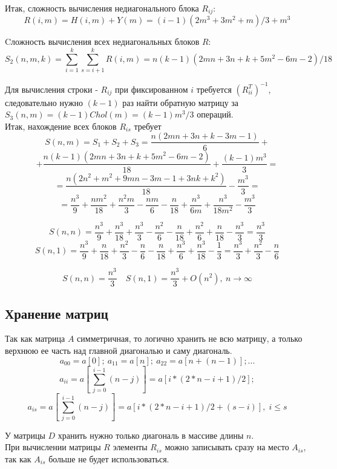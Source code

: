 \documentclass[a4paper,12pt]{article}
\begin{document}
    Итак, сложность вычисления недиагонального блока $R_{ij}$:
    $$ 
        R(i,m) = H(i,m) + Y(m) =
        (i-1)(2m^3+3m^2+m)/3 + m^3
    $$
    
    Cложность вычисления всех недиагональных блоков $R$:
    $$ 
        S_2(n,m,k) = 
        \sum_{i=1}^k\sum_{s=i+1}^k R(i,m) =
        n(k-1)(2mn+3n+k+5m^2-6m-2)/18
    $$
    
    Для вычисления строки - $R_{ij}$ при фиксированном $i$ требуется $(R_{ii}^T)^{-1}$,
    следовательно нужно $(k-1)$ раз найти обратную матрицу за \\
    $S_3(n, m) = (k-1)Chol(m) = (k-1)m^3/3$ операций. \\
    
    Итак, нахождение всех блоков $R_{is}$ требует
    $$
        S(n, m)= S_1 + S_2 + S_3 = 
        \frac{n(2mn + 3n + k - 3m -1)}6 + $$$$ +
        \frac{n(k-1)(2mn+3n+k+5m^2-6m-2)}{18} +
        \frac{(k-1)m^3}3 = $$$$ =
        \frac{n(2n^2+m^2+9mn-3m-1+3nk+k^2)}{18} - \frac{m^3}3 = $$$$ =
        \boxed {
            \frac{n^3}9 + \frac{nm^2}{18} + \frac{n^2m}3 - \frac{nm}6 -
            \frac{n}{18} + \frac{n^3}{6m} + \frac{n^3}{18m^2} - \frac{m^3}3  }
    $$
    
    $$ 
        S(n,n) =
        \frac{n^3}9 + \frac{n^3}{18} + \frac{n^3}3 - \frac{n^2}6 - 
        \frac{n}{18} + \frac{n^2}6 + \frac{n}{18} - \frac{n^3}3 = 
        \frac{n^3}3
    $$
    $$
        S(n,1) = 
        \frac{n^3}9 + \frac{n}{18} + \frac{n^2}3 - \frac{n}6 -
        \frac{n}{18} + \frac{n^3}6 + \frac{n^3}{18} - \frac{1}3 =
        \frac{n^3}3 + \frac{n^2}3 - \frac{n}6
    $$
    
    $$
        \boxed {
            S(n,n) = \frac{n^3}3 \quad 
            S(n,1) = \frac{n^3}3 + O(n^2),\ n \to \infty   }
    $$
    
    

\newpage
\subsection{Хранение матриц}
    Так как матрица $A$ симметричная, то логично хранить не всю матрицу, 
    а только верхнюю ее часть над главной диагональю и саму диагональ. 
    $$ a_{00} = a [0]; \ a_{11} = a [n]; \ a_{22} = a [n + (n-1)]; ... $$
    $$ a_{ii} = a [\,\sum_{j=0}^{i-1}(n-j)] = a [i * (2 * n - i +1) / 2];  $$
    $$ 
        a_{is} = a [\,\sum_{j=0}^{i-1}(n-j)] = a [i * (2 * n - i +1) / 2 + (s - i)], 
        \; i \leq s  
    $$
    
    У матрицы $D$ хранить нужно только диагональ в массиве длины $n$.\\
    
    При вычислении матрицы $R$ элементы $R_{is}$ можно записывать сразу на место $A_{is}$,
    так как $A_{is}$ больше не будет использоваться. 

    
\end{document}

